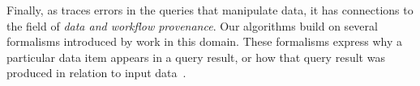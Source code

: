 Finally, as \sys traces errors in the queries that manipulate data, it
has connections to the field of \emph{data and workflow provenance}.
Our algorithms build on several formalisms introduced by work in this
domain. These formalisms express why a particular data item appears in
a query result, or how that query result was produced in relation to
input data~\cite{BunemanKT01,GKT07-semirings, CheneyCT09, CuiWW00
}.


